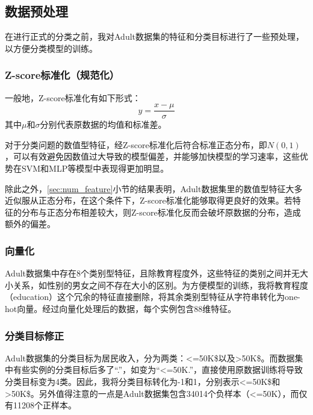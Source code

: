 \documentclass[12pt,a4paper]{article}
\theoremstyle{definition}
\begin{document}
\subsection{数据预处理}

在进行正式的分类之前，我对Adult数据集的特征和分类目标进行了一些预处理，以方便分类模型的训练。

\subsubsection{Z-score标准化（规范化）}

一般地，Z-score标准化有如下形式：
\begin{equation}
	y = \dfrac{x - \mu}{\sigma}
\end{equation}
其中$\mu$和$\sigma$分别代表原数据的均值和标准差。

\vspace{0.01\linewidth}
对于分类问题的数值型特征，经Z-score标准化后符合标准正态分布，即$N(0, 1)$，可以有效避免因数值过大导致的模型偏差，并能够加快模型的学习速率，这些优势在SVM和MLP等模型中表现得更加明显。

\vspace{0.01\linewidth}
除此之外，\ref{sec:num_feature}小节的结果表明，Adult数据集里的数值型特征大多近似服从正态分布，在这个条件下，Z-score标准化能够取得更良好的效果。若特征的分布与正态分布相差较大，则Z-score标准化反而会破坏原数据的分布，造成额外的偏差。

\subsubsection{向量化}

Adult数据集中存在8个类别型特征，且除教育程度外，这些特征的类别之间并无大小关系，如性别的男女之间不存在大小的区别。为方便模型的训练，我将教育程度（education）这个冗余的特征直接删除，将其余类别型特征从字符串转化为one-hot向量。经过向量化处理后的数据，每个实例包含88维特征。

\subsubsection{分类目标修正}
\label{sec:fix-target}

Adult数据集的分类目标为居民收入，分为两类：<=50K\$以及>50K\$。而数据集中有些实例的分类目标后多了“.”，如变为“<=50K.”，直接使用原数据训练将导致分类目标变为4类。因此，我将分类目标转化为-1和1，分别表示<=50K\$和>50K\$。另外值得注意的一点是Adult数据集包含34014个负样本（<=50K），而仅有11208个正样本。
\end{document}
